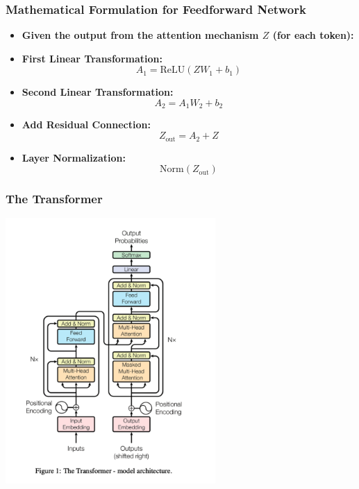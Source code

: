 \documentclass{beamer}
\begin{document}
\begin{frame}
    \frametitle{Mathematical Formulation for Feedforward Network}
    
    \begin{itemize}
        \item \textbf{Given the output from the attention mechanism \( Z \) (for each token):}
        \pause
        \item \textbf{First Linear Transformation:}
        \[
        A_1 = \text{ReLU}(Z W_1 + b_1)
        \]
        \pause
        
        \item \textbf{Second Linear Transformation:}
        \[
        A_2 = A_1 W_2 + b_2
        \]
        \pause

        \item \textbf{Add Residual Connection:}
        \[
        Z_{\text{out}} = A_2 + Z
        \]
        \pause
        \item \textbf{Layer Normalization:}
        \[
        \text{Norm}(Z_{\text{out}})
        \]
    \end{itemize}
    
\end{frame}
\begin{frame}
    \frametitle{The Transformer}
    
    \begin{center}
        \includegraphics[width=0.6\textwidth]{t-Photoroom.png}  %
    \end{center}
    
\end{frame}
\end{document}
